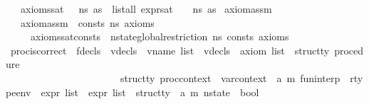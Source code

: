 \begin{isabellebody}
\ \ \ {\isachardoublequoteopen}axioms{\isacharunderscore}{\kern0pt}sat\ {\isasymLambda}\ {\isasymGamma}\ n{\isacharunderscore}{\kern0pt}s\ as\ {\isacharequal}{\kern0pt}\ list{\isacharunderscore}{\kern0pt}all\ {\isacharparenleft}{\kern0pt}expr{\isacharunderscore}{\kern0pt}sat\ {\isasymLambda}\ {\isasymGamma}\ {\isacharbrackleft}{\kern0pt}{\isacharbrackright}{\kern0pt}\ n{\isacharunderscore}{\kern0pt}s{\isacharparenright}{\kern0pt}\ as{\isachardoublequoteclose}\isanewline
\isanewline
{}\isamarkupfalse%
\ axiom{\isacharunderscore}{\kern0pt}assm\isanewline
\ \ \ {\isachardoublequoteopen}axiom{\isacharunderscore}{\kern0pt}assm\ {\isasymGamma}\ consts\ ns\ axioms\ {\isasymequiv}\ \isanewline
\ \ \ \ \ {\isacharparenleft}{\kern0pt}axioms{\isacharunderscore}{\kern0pt}sat{\isacharparenleft}{\kern0pt}consts{\isacharcomma}{\kern0pt}\ {\isacharbrackleft}{\kern0pt}{\isacharbrackright}{\kern0pt}{\isacharparenright}{\kern0pt}\ {\isasymGamma}{\isacharparenleft}{\kern0pt}nstate{\isacharunderscore}{\kern0pt}global{\isacharunderscore}{\kern0pt}restriction\ ns\ consts{\isacharparenright}{\kern0pt}\ axioms{\isacharparenright}{\kern0pt}{\isachardoublequoteclose}\isanewline
\isanewline
\isanewline
{}\isamarkupfalse%
\ proc{\isacharunderscore}{\kern0pt}is{\isacharunderscore}{\kern0pt}correct\ {\isacharcolon}{\kern0pt}{\isacharcolon}{\kern0pt}\ {\isachardoublequoteopen}fdecls\ {\isasymRightarrow}\ vdecls\ {\isasymRightarrow}\ vname\ list\ {\isasymRightarrow}\ vdecls\ {\isasymRightarrow}\ axiom\ list\ {\isasymRightarrow}\ {\isacharprime}{\kern0pt}struct{\isacharunderscore}{\kern0pt}ty{}\ procedure\ {\isasymRightarrow}\isanewline
\ \ \ \ \ \ \ \ \ \ \ \ \ \ \ \ \ \ \ \ \ \ \ {\isacharparenleft}{\kern0pt}{\isacharprime}{\kern0pt}struct{\isacharunderscore}{\kern0pt}ty\ proc{\isacharunderscore}{\kern0pt}context\ {\isasymRightarrow}\ var{\isacharunderscore}{\kern0pt}context\ {\isasymRightarrow}\ {\isacharparenleft}{\kern0pt}{\isacharprime}{\kern0pt}a{\isacharcomma}{\kern0pt}\ {\isacharprime}{\kern0pt}m{\isacharparenright}{\kern0pt}\ fun{\isacharunderscore}{\kern0pt}interp\ {\isasymRightarrow}\ rtype{\isacharunderscore}{\kern0pt}env\ {\isasymRightarrow}\ expr\ list\ {\isasymRightarrow}\ expr\ list\ {\isasymRightarrow}\ {\isacharprime}{\kern0pt}struct{\isacharunderscore}{\kern0pt}ty{}\ {\isasymRightarrow}\ {\isacharparenleft}{\kern0pt}{\isacharprime}{\kern0pt}a{\isacharcomma}{\kern0pt}\ {\isacharprime}{\kern0pt}m{\isacharparenright}{\kern0pt}\ nstate\ {\isasymRightarrow}\ bool{\isacharparenright}{\kern0pt}\ {\isasymRightarrow}\isanewline

\end{isabellebody}

